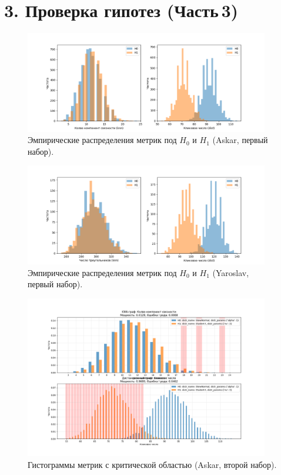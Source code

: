 \documentclass[a4paper,12pt]{article}
\begin{document}
\section*{3. Проверка гипотез (Часть\,3)}

\begin{figure}[H]
    \centering
    \includegraphics[width=0.95\textwidth]{part3_results_0_Askar.png}
    \caption{Эмпирические распределения метрик под $H_0$ и $H_1$ (Askar, первый набор).}
    \label{fig:part3-0-askar}
\end{figure}

\begin{figure}[H]
    \centering
    \includegraphics[width=0.95\textwidth]{part3_results_0_Yaroslav.png}
    \caption{Эмпирические распределения метрик под $H_0$ и $H_1$ (Yaroslav, первый набор).}
    \label{fig:part3-0-yaroslav}
\end{figure}

\begin{figure}[H]
    \centering
    \includegraphics[width=0.95\textwidth]{part3_results_1_Askar.png}
    \caption{Гистограммы метрик с критической областью (Askar, второй набор).}
    \label{fig:part3-1-askar}
\end{figure}
\end{document}

